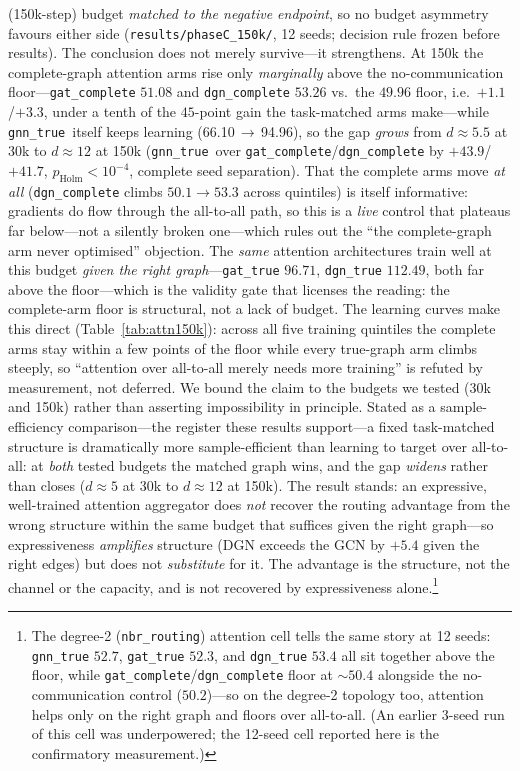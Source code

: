 \documentclass[10pt]{article}
\makeatletter
\newcommand{\gtrue}{\texttt{gnn\_true}}
\newcommand{\SCtrueN}{66.10}          %
\newcommand{\SCtrueAttCompD}{5.5}     %
\newcommand{\SCkTrue}{94.96}          %
\newcommand{\SCkGatComplete}{51.08}   %
\newcommand{\SCkDgnComplete}{53.26}   %
\newcommand{\SCkGatTrue}{96.71}       %
\newcommand{\SCkDgnTrue}{112.49}      %
\newcommand{\SCkMlp}{49.96}           %
\newcommand{\SCkTrueGatCompGap}{+43.9}%
\newcommand{\SCkTrueDgnCompGap}{+41.7}%
\newcommand{\SCkTrueAttCompD}{12}     %
\makeatother
\begin{document}
(150k-step) budget \emph{matched to the negative endpoint}, so no budget
asymmetry favours either side (\texttt{results/phaseC\_150k/}, 12 seeds; decision
rule frozen before results). The conclusion does not merely survive---it
strengthens. At 150k the complete-graph attention arms rise only
\emph{marginally} above the no-communication floor---\texttt{gat\_complete}
$\SCkGatComplete$ and \texttt{dgn\_complete} $\SCkDgnComplete$ vs.\ the $\SCkMlp$
floor, i.e.\ $+1.1$/$+3.3$, under a tenth of the $45$-point gain the task-matched
arms make---while \gtrue\ itself keeps learning (\SCtrueN$\,\to\,$\SCkTrue), so
the gap \emph{grows} from $d{\approx}\SCtrueAttCompD$ at 30k to
$d{\approx}\SCkTrueAttCompD$ at 150k (\gtrue\ over
\texttt{gat\_complete}/\texttt{dgn\_complete} by
$\SCkTrueGatCompGap$/$\SCkTrueDgnCompGap$, $p_{\text{Holm}}<10^{-4}$, complete
seed separation). That the complete arms move \emph{at all}
(\texttt{dgn\_complete} climbs $50.1\!\to\!53.3$ across quintiles) is itself
informative: gradients do flow through the all-to-all path, so this is a
\emph{live} control that plateaus far below---not a silently broken one---which
rules out the ``the complete-graph arm never optimised'' objection. The
\emph{same} attention architectures train well
at this budget \emph{given the right graph}---\texttt{gat\_true} $\SCkGatTrue$,
\texttt{dgn\_true} $\SCkDgnTrue$, both far above the floor---which is the
validity gate that licenses the reading: the complete-arm floor is structural,
not a lack of budget. The learning curves make this direct
(Table~\ref{tab:attn150k}): across all five training quintiles the complete arms
stay within a few points of the floor while every true-graph arm climbs steeply, so
``attention over all-to-all merely needs more training'' is refuted by
measurement, not deferred. We bound the claim to the budgets we tested (30k and
150k) rather than asserting impossibility in principle. Stated as a
sample-efficiency comparison---the register these results support---a fixed
task-matched structure is dramatically more sample-efficient than learning to
target over all-to-all: at \emph{both} tested budgets the matched graph wins,
and the gap \emph{widens} rather than closes ($d{\approx}5$ at 30k to
$d{\approx}12$ at 150k). The result stands: an
expressive, well-trained attention
aggregator does \emph{not} recover the routing advantage from the wrong
structure within the same budget that suffices given the right graph---so
expressiveness \emph{amplifies} structure (DGN exceeds the GCN by $+5.4$ given
the right edges) but does not \emph{substitute} for it. The advantage is the
structure, not the channel or the capacity, and is not recovered by
expressiveness alone.\footnote{The degree-2 (\texttt{nbr\_routing}) attention
cell tells the same story at 12 seeds: \texttt{gnn\_true} $52.7$,
\texttt{gat\_true} $52.3$, and \texttt{dgn\_true} $53.4$ all sit together
above the floor, while \texttt{gat\_complete}/\texttt{dgn\_complete} floor
at ${\sim}50.4$ alongside the no-communication control ($50.2$)---so on the
degree-2 topology too, attention helps only on the right graph and floors
over all-to-all. (An earlier 3-seed run of this cell was underpowered; the
12-seed cell reported here is the confirmatory measurement.)}
\end{document}

